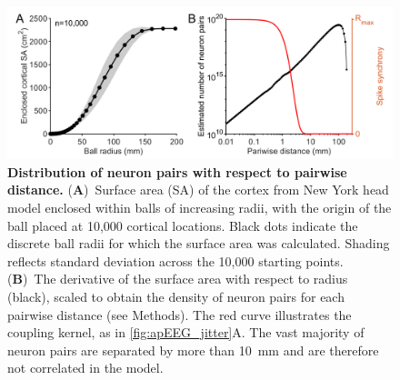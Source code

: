 \begin{figure}[h!]
    \centering
    \includegraphics[width=13.2cm]{Figures/chapter3/figureS4.png}
    \caption{\textbf{Distribution of neuron pairs with respect to pairwise distance.} (\textbf{A})~Surface area (SA) of the cortex from New York head model enclosed within balls of increasing radii, with the origin of the ball placed at 10,000 cortical locations. Black dots indicate the discrete ball radii for which the surface area was calculated. Shading reflects standard deviation across the 10,000 starting points. (\textbf{B})~The derivative of the surface area with respect to radius (black), scaled to obtain the density of neuron pairs for each pairwise distance (see Methods). The red curve illustrates the coupling kernel, as in {\autoref{fig:apEEG_jitter}A}. The vast majority of neuron pairs are separated by more than 10~\unit{\milli\meter} and are therefore not correlated in the model.} 
    \label{fig:counting_pairwise}
\end{figure}

\clearpage

